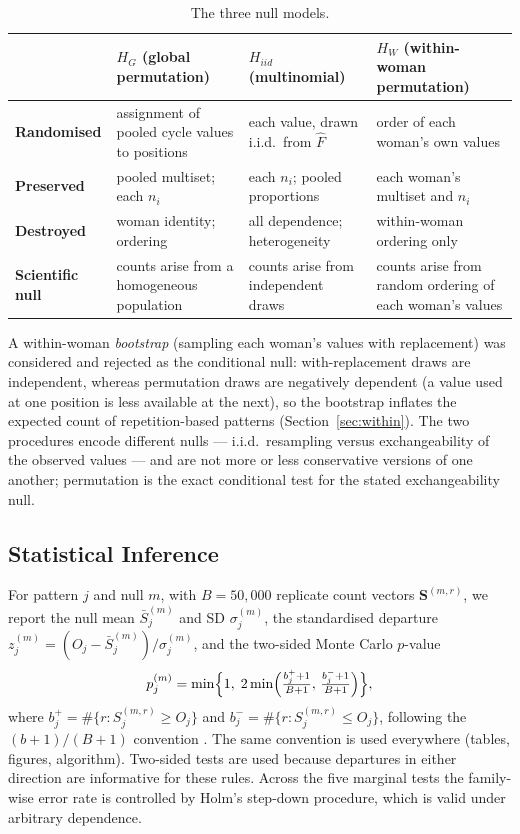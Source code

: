 \documentclass[12pt]{article}
\newcommand{\HG}{H_{G}}
\newcommand{\HI}{H_{iid}}
\newcommand{\HW}{H_{W}}
\begin{document}
\begin{table}[!htbp]
\centering
\caption{The three null models.}
\label{tab:nullmodels}
\small
\begin{tabular}{L{3.0cm} L{3.7cm} L{3.7cm} L{3.7cm}}
\toprule
& $\HG$ (global permutation) & $\HI$ (multinomial) & $\HW$ (within-woman permutation) \\
\midrule
\textbf{Randomised} & assignment of pooled cycle values to positions & each value, drawn i.i.d.\ from $\hat F$ & order of each woman's own values \\[3pt]
\textbf{Preserved} & pooled multiset; each $n_i$ & each $n_i$; pooled proportions & each woman's multiset and $n_i$ \\[3pt]
\textbf{Destroyed} & woman identity; ordering & all dependence; heterogeneity & within-woman ordering only \\[3pt]
\textbf{Scientific null} & counts arise from a homogeneous population & counts arise from independent draws & counts arise from random ordering of each woman's values \\
\bottomrule
\end{tabular}
\end{table}

A within-woman \emph{bootstrap} (sampling each woman's values with replacement) was
considered and rejected as the conditional null: with-replacement draws are independent,
whereas permutation draws are negatively dependent (a value used at one position is less
available at the next), so the bootstrap inflates the expected count of repetition-based
patterns (Section~\ref{sec:within}). The two
procedures encode different nulls --- i.i.d.\ resampling versus exchangeability of the
observed values --- and are not more or less conservative versions of one another;
permutation is the exact conditional test for the stated exchangeability null.

\subsection{Statistical Inference}
\label{sec:inference}

For pattern $j$ and null $m$, with $B = 50{,}000$ replicate count vectors
$\mathbf{S}^{(m,r)}$, we report the null mean $\bar S_j^{(m)}$ and SD $\sigma_j^{(m)}$,
the standardised departure $z_j^{(m)} = (O_j - \bar S_j^{(m)})/\sigma_j^{(m)}$, and the
two-sided Monte Carlo $p$-value
\begin{equation}
  p_j^{(m)} = \min\Bigl\{1,\; 2\min\Bigl(\tfrac{b_j^+ + 1}{B+1},\, \tfrac{b_j^- + 1}{B+1}\Bigr)\Bigr\},
  \label{eq:ptwo}
\end{equation}
where $b_j^+ = \#\{r : S_j^{(m,r)} \geq O_j\}$ and $b_j^- = \#\{r : S_j^{(m,r)} \leq O_j\}$,
following the $(b+1)/(B+1)$ convention \citep{davison1997,phipson2010}. The same
convention is used everywhere (tables, figures, algorithm). Two-sided tests are used
because departures in either direction are informative for these rules. Across the five
marginal tests the family-wise error rate is controlled by Holm's step-down procedure,
which is valid under arbitrary dependence.
\end{document}
